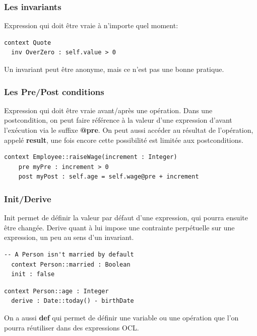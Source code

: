 \documentclass[../Syllabus.tex]{subfiles}
\begin{document}
\subsubsection{Les invariants}

Expression qui doit être vraie à n'importe quel moment:

\begin{lstlisting}[language=OCL]
  context Quote
  inv OverZero : self.value > 0
\end{lstlisting}

Un invariant peut être anonyme, mais ce n'est pas une bonne pratique.

\subsubsection{Les Pre/Post conditions}

Expression qui doit être vraie avant/après une opération. Dans une postcondition, on peut faire référence à la valeur d'une expression d'avant l'exécution via le suffixe \textbf{@pre}. On peut aussi accéder au résultat de l'opération, appelé \textbf{result}, une fois encore cette possibilité est limitée aux postconditions.

\begin{lstlisting}[language=OCL]
  context Employee::raiseWage(increment : Integer)
    pre myPre : increment > 0
    post myPost : self.age = self.wage@pre + increment
\end{lstlisting}

\subsubsection{Init/Derive}

Init permet de définir la valeur par défaut d'une expression, qui pourra ensuite être changée. Derive quant à lui impose une contrainte perpétuelle sur une expression, un peu au sens d'un invariant.

\begin{lstlisting}[language=OCL]
  -- A Person isn't married by default
  context Person::married : Boolean
  init : false
\end{lstlisting}

\begin{lstlisting}[language=OCL]
  context Person::age : Integer
  derive : Date::today() - birthDate
\end{lstlisting}

On a aussi \textbf{def} qui permet de définir une variable ou une opération que l'on pourra réutiliser dans des expressions OCL.
\end{document}
